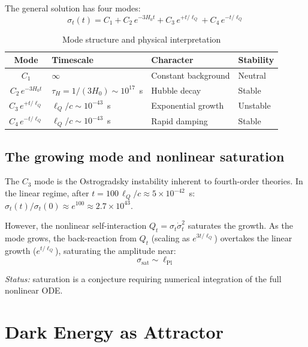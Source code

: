 \documentclass[11pt,a4paper]{article}
\theoremstyle{plain}
\theoremstyle{definition}
\theoremstyle{remark}
\newcommand{\lQ}{\ell_Q}
\begin{document}
The general solution has four modes:
\begin{equation}
  \boxed{\sigma_t(t) = C_1 + C_2\,e^{-3H_0 t} + C_3\,e^{+t/\lQ} + C_4\,e^{-t/\lQ}}
  \label{eq:four_modes}
\end{equation}

\begin{table}[h]
  \centering
  \caption{Mode structure and physical interpretation}
  \begin{tabular}{@{}clll@{}}
    \toprule
    Mode & Timescale & Character & Stability \\
    \midrule
    $C_1$ & $\infty$ & Constant background & Neutral \\
    $C_2\,e^{-3H_0t}$ & $\tau_H = 1/(3H_0) \sim 10^{17}$~s & Hubble decay & Stable \\
    $C_3\,e^{+t/\lQ}$ & $\lQ/c \sim 10^{-43}$~s & Exponential growth & Unstable \\
    $C_4\,e^{-t/\lQ}$ & $\lQ/c \sim 10^{-43}$~s & Rapid damping & Stable \\
    \bottomrule
  \end{tabular}
\end{table}

\subsection{The growing mode and nonlinear saturation}

The $C_3$ mode is the Ostrogradsky instability inherent to fourth-order theories.  In the linear regime, after $t = 100\,\lQ/c \approx 5\times10^{-42}$~s: $\sigma_t(t)/\sigma_t(0) \approx e^{100} \approx 2.7\times10^{43}$.

However, the nonlinear self-interaction $Q_t = \sigma_t\dot\sigma_t^2$ saturates the growth.  As the mode grows, the back-reaction from $Q_t$ (scaling as $e^{3t/\lQ}$) overtakes the linear growth ($e^{t/\lQ}$), saturating the amplitude near:
\begin{equation}
  \sigma_{\mathrm{sat}} \sim \ell_{\mathrm{Pl}}
\end{equation}

\emph{Status:} saturation is a conjecture requiring numerical integration of the full nonlinear ODE.

\section{Dark Energy as Attractor}
\label{sec:dark_energy}
\end{document}
